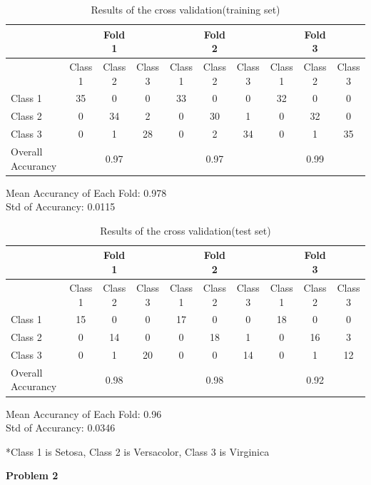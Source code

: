 \documentclass[epsfig]{article}
\def\bpar{\vskip26pt}
\def\npar{\vskip13pt}
\def\spar{\vskip10pt}
\begin{document}
\begin{table}[H]
	\caption{Results of the cross validation(training set)}
	
	\begin{tabular}{|l|ccc|ccc|ccc|}
		\hline
		& &Fold 1 & & &Fold 2 & & &Fold 3 &\\
		\hline
		
		\diagbox{Actual}{Desired} & Class 1 & Class 2 & Class 3& Class 1 & Class 2 & Class 3& Class 1 & Class 2 & Class 3 \\
		\hline
		Class 1&35 &0 &0&33 &0 &0&32 &0 &0\\
		Class 2&0 & 34&2& 0&30 &1&0 &32 &0\\
		Class 3&0 &1 &28& 0&2 &34&0 &1 &35\\

		\hline
		Overall	Accurancy & &0.97 & & &0.97&  & &0.99 &  \\
		\hline
		
	\end{tabular}\spar
	Mean Accurancy of Each Fold: 0.978    \\
	Std of Accurancy: 0.0115
\end{table}
\begin{table}[H]
	\caption{Results of the cross validation(test set)}

	\begin{tabular}{|l|ccc|ccc|ccc|}
		\hline
		& &Fold 1 & & &Fold 2 & & &Fold 3 &\\
	\hline

	\diagbox{Actual}{Desired} & Class 1 & Class 2 & Class 3& Class 1 & Class 2 & Class 3& Class 1 & Class 2 & Class 3 \\
	\hline
	Class 1&15 &0 &0&17 &0 &0&18 &0 &0\\
	Class 2&0 & 14&0& 0&18 &1&0 &16 &3\\
	Class 3&0 &1 &20& 0&0 &14&0 &1 &12\\
	

		\hline
	Overall	Accurancy & &0.98 & & &0.98&  & &0.92 &  \\
	\hline

\end{tabular}\spar
			Mean Accurancy of Each Fold: 0.96    \\
			Std of Accurancy: 0.0346
\end{table}
			*Class 1 is Setosa, Class 2 is Versacolor, Class 3 is Virginica

{\bf 
\npar
Problem 2
\bpar
}
\end{document}
